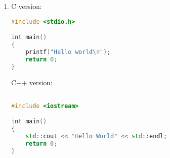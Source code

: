 \documentclass[12pt]{article}
\newcommand{\fin}{\hfill $\square$}
\begin{document}
\begin{enumerate}
(f) False. $\lim_{x\rightarrow 0}\frac{e^x-1}{x^2}=\lim_{x\rightarrow 0}\frac{e^x}{2x}=+\infty$.

(g) True. $\lim_{x\rightarrow 0}\frac{\cos(x)-1}{x^2} = \lim_{x\rightarrow 0}\frac{-\sin(x)}{2x} = \lim_{x\rightarrow 0}\frac{-\cos(x)}{2}=-1/2$.
\fin
\item
C version:
\begin{lstlisting}[language=C]
#include <stdio.h>

int main()
{
    printf("Hello world\n");
    return 0;
}
\end{lstlisting}
C++ version:
\begin{lstlisting}[language=C++]

#include <iostream>

int main()
{
    std::cout << "Hello World" << std::endl;
    return 0;
}
\end{lstlisting}
\end{enumerate}
\end{document}
